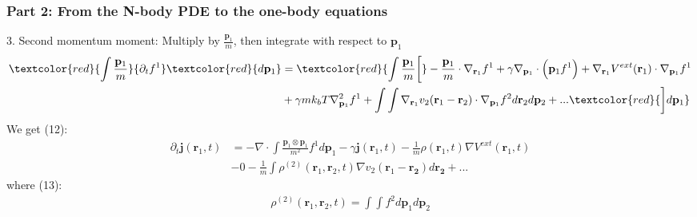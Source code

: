 \documentclass[aspectratio=169,xcolor=dvipsnames]{beamer}
\begin{document}
\begin{frame}
	\frametitle{Part 2: From the N-body PDE to the one-body equations}
	\vspace{0.5 cm}
	3. Second momentum moment: Multiply by $\frac{\mathbf{p}_1}{m}$, then integrate with respect to $\mathbf{p}_1$
	\begin{align*}
	\textcolor{red}{\int \frac{\mathbf{p}_1}{m}}{\partial_t f^1} \textcolor{red}{d \mathbf{p}_1}&= \textcolor{red}{\int \frac{\mathbf{p}_1}{m} \bigg[} - \frac{\mathbf{p}_1}{m} \cdot \nabla_{\mathbf{r}_1}f^1 + \gamma \nabla_{\mathbf{p}_1} \cdot \left(\mathbf{p}_1 f^1\right)
	+ {\nabla_{\mathbf{r}_1}V^{ext}(\mathbf{r}_1)} \cdot \nabla_{\mathbf{p}_1}f^1\\
	&+ \gamma mk_bT \nabla^2_{\mathbf{p}_1} f^1 + \int \int {\nabla_{\mathbf{r}_1}v_2(\mathbf{r}_1 - \mathbf{r}_2)} \cdot \nabla_{\mathbf{p}_1}f^2 d \mathbf{r}_2 d \mathbf{p}_2 + ... \textcolor{red}{\bigg] d \mathbf{p}_1}
	\end{align*}
	We get (12):
	\begin{align*}
\partial_t \mathbf{j}(\mathbf{r}_1,t) &= - \nabla \cdot \int \frac{\mathbf{p}_1 \otimes \mathbf{p}_1}{m^2} f^1 d \mathbf{p}_1 - \gamma \mathbf{j}(\mathbf{r}_1,t) -\frac{1}{m} \rho(\mathbf{r}_1,t) \nabla V^{ext}(\mathbf{r}_1,t)\\
& - 0 - \frac{1}{m} \int \rho^{(2)}(\mathbf{r}_1, \mathbf{r}_2,t) \nabla v_2(\mathbf{r}_1 - \mathbf{r_2}) d \mathbf{r_2} + ...
\end{align*}
	where (13):
	\begin{align*}
	\rho^{(2)}(\mathbf{r}_1, \mathbf{r}_2,t) = \int \int f^2 d \mathbf{p}_1 d\mathbf{p}_2
	\end{align*}
	
\end{frame}
\end{document}
